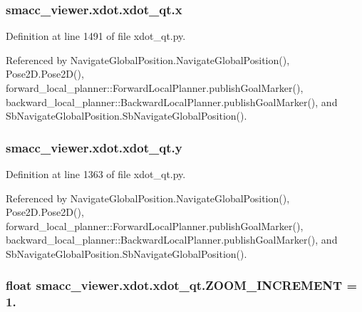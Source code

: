 \subsubsection[{\texorpdfstring{x}{x}}]{\setlength{\rightskip}{0pt plus 5cm}smacc\+\_\+viewer.\+xdot.\+xdot\+\_\+qt.\+x}\hypertarget{namespacesmacc__viewer_1_1xdot_1_1xdot__qt_a1dd3d4e1f636ed9ebbed9b32d4c196df}{}\label{namespacesmacc__viewer_1_1xdot_1_1xdot__qt_a1dd3d4e1f636ed9ebbed9b32d4c196df}


Definition at line 1491 of file xdot\+\_\+qt.\+py.



Referenced by Navigate\+Global\+Position.\+Navigate\+Global\+Position(), Pose2\+D.\+Pose2\+D(), forward\+\_\+local\+\_\+planner\+::\+Forward\+Local\+Planner.\+publish\+Goal\+Marker(), backward\+\_\+local\+\_\+planner\+::\+Backward\+Local\+Planner.\+publish\+Goal\+Marker(), and Sb\+Navigate\+Global\+Position.\+Sb\+Navigate\+Global\+Position().

\subsubsection[{\texorpdfstring{y}{y}}]{\setlength{\rightskip}{0pt plus 5cm}smacc\+\_\+viewer.\+xdot.\+xdot\+\_\+qt.\+y}\hypertarget{namespacesmacc__viewer_1_1xdot_1_1xdot__qt_a784c76c541d5dd5940e217a1aa54f256}{}\label{namespacesmacc__viewer_1_1xdot_1_1xdot__qt_a784c76c541d5dd5940e217a1aa54f256}


Definition at line 1363 of file xdot\+\_\+qt.\+py.



Referenced by Navigate\+Global\+Position.\+Navigate\+Global\+Position(), Pose2\+D.\+Pose2\+D(), forward\+\_\+local\+\_\+planner\+::\+Forward\+Local\+Planner.\+publish\+Goal\+Marker(), backward\+\_\+local\+\_\+planner\+::\+Backward\+Local\+Planner.\+publish\+Goal\+Marker(), and Sb\+Navigate\+Global\+Position.\+Sb\+Navigate\+Global\+Position().

\subsubsection[{\texorpdfstring{Z\+O\+O\+M\+\_\+\+I\+N\+C\+R\+E\+M\+E\+NT}{ZOOM_INCREMENT}}]{\setlength{\rightskip}{0pt plus 5cm}float smacc\+\_\+viewer.\+xdot.\+xdot\+\_\+qt.\+Z\+O\+O\+M\+\_\+\+I\+N\+C\+R\+E\+M\+E\+NT = 1.}\hypertarget{namespacesmacc__viewer_1_1xdot_1_1xdot__qt_afe0fd0e6353c1bf45deab0c2906eb06a}{}\label{namespacesmacc__viewer_1_1xdot_1_1xdot__qt_afe0fd0e6353c1bf45deab0c2906eb06a}


